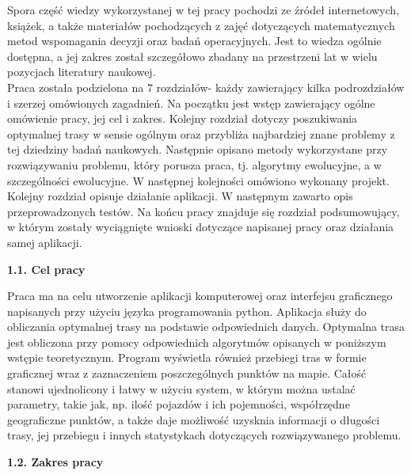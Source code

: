 \documentclass[a4paper, twoside, 12pt, justified]{article}
\begin{document}
	
	Spora część wiedzy wykorzystanej w tej pracy pochodzi ze źródeł internetowych, książek, a także materiałów pochodzących z zajęć dotyczących matematycznych metod wspomagania decyzji oraz badań operacyjnych. Jest to wiedza ogólnie dostępna, a jej zakres został szczegółowo zbadany na przestrzeni lat w wielu pozycjach literatury naukowej.\\
	
	Praca została podzielona na 7 rozdziałów- każdy zawierający kilka podrozdziałów i szerzej omówionych zagadnień. Na początku jest wstęp zawierający ogólne omówienie pracy, jej cel i zakres. Kolejny rozdział dotyczy poszukiwania optymalnej trasy w sensie ogólnym oraz przybliża najbardziej znane problemy z tej dziedziny badań naukowych. Następnie opisano metody wykorzystane przy rozwiązywaniu problemu, który porusza praca, tj. algorytmy ewolucyjne, a w szczególności ewolucyjne. W następnej kolejności omówiono wykonany projekt. Kolejny rozdział opisuje działanie aplikacji. W następnym zawarto opis przeprowadzonych testów. Na końcu pracy znajduje się rozdział podsumowujący, w którym zostały wyciągnięte wnioski dotyczące napisanej pracy oraz działania samej aplikacji.
	
	\begin{flushleft}
		\begin{large}
			\textbf{1.1. Cel pracy}
		\end{large}
	\end{flushleft}
	\vspace{5mm} %
	
	Praca ma na celu utworzenie aplikacji komputerowej oraz interfejsu graficznego napisanych przy użyciu języka programowania python. Aplikacja służy do obliczania optymalnej trasy na podstawie odpowiednich danych. Optymalna trasa jest obliczona przy pomocy odpowiednich algorytmów opisanych w poniższym wstępie teoretycznym. Program wyświetla również przebiegi tras w formie graficznej wraz z zaznaczeniem poszczególnych punktów na mapie. Całość stanowi ujednolicony i łatwy w użyciu system, w którym można ustalać parametry, takie jak, np. ilość pojazdów i ich pojemności, współrzędne geograficzne punktów, a także daje możliwość uzysknia informacji o długości trasy, jej przebiegu i innych statystykach dotyczących rozwiązywanego problemu.  
	\vspace{5mm} %
	
	\begin{flushleft}
		\begin{large}
			\textbf{1.2. Zakres pracy}
		\end{large}
	\end{flushleft}
	\vspace{5mm} %
	
\end{document}
